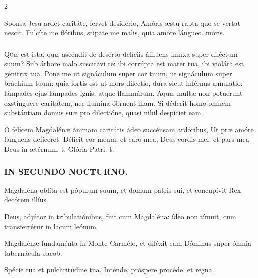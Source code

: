 \documentclass[9pt,twoside]{extarticle}
\begin{document}
\begin{multicols}{2}
\begin{tightlist}{}
\item {} Sponsa Jesu ardet caritáte, fervet desidério, \textred{*} Amóris æstu rapta quo se vertat nescit.  Fulcíte me flóribus, stipáte me malis, quia amóre lángueo. móris.
\end{tightlist}

\subsubsection*{\center {}}
\lettrine{Q}uæ est ista, quæ ascéndit de desérto delíciis áffluens inníxa super diléctum suum? Sub árbore malo suscitávi te: ibi corrúpta est mater tua, ibi violáta est génitrix tua. Pone me ut signáculum super cor tuum, ut signáculum super bráchium tuum: quia fortis est ut mors diléctio, dura sicut inférnus æmulátio: lámpades ejus lámpades ignis, atque flammárum. Aquæ multæ non potuérunt exstínguere caritátem, nec flúmina óbruent illam. Si déderit homo omnem substántiam domus suæ pro dilectióne, quasi nihil despíciet eam.

\begin{tightlist}{}
\item {} O felícem Magdalénæ ánimam caritátis ádeo succénsam ardóribus, \textred{*} Ut præ amóre languens defíceret.  Déficit cor meum, et caro mea, Deus cordis mei, et pars mea Deus in ætérnum. t. Glória Patri. t.
\end{tightlist}

\subsubsection*{\center \textsc{IN SECUNDO NOCTURNO.}}
\begin{tightlist}{}
\item {} Magdaléna oblíta est pópulum suum, et domum patris sui, et concupívit Rex decórem illíus.
\item {} Deus, adjútor in tribulatiónibus, fuit cum Magdaléna: ídeo non tímuit, cum transferrétur in lacum leónum.
\item {} Magdalénæ fundaménta in Monte Carmélo, et diléxit eam Dóminus super ómnia tabernácula Jacob.
\item {} Spécie tua et pulchritúdine tua.  Inténde, próspere procéde, et regna.
\end{tightlist}


\end{multicols}
\end{document}
